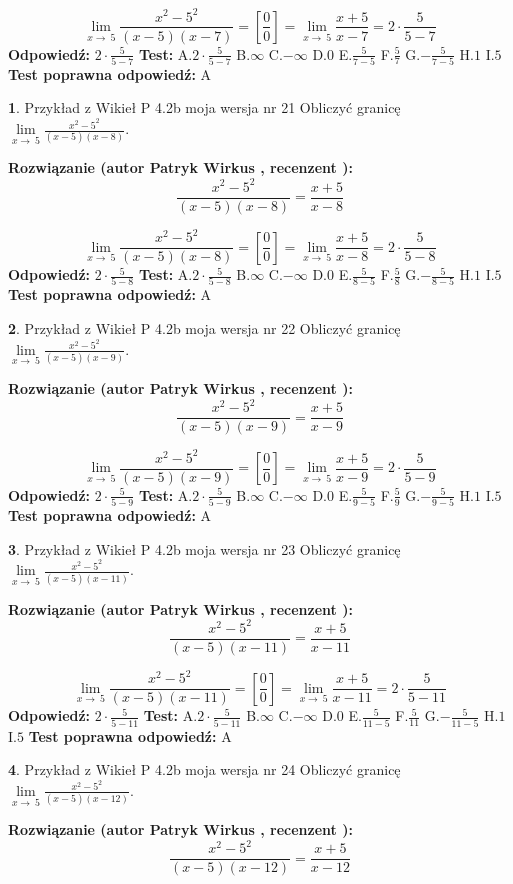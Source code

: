 \documentclass[12pt, a4paper]{article}
\theoremstyle{definition} %
\newtheorem{zad}{}
\newcommand{\zadStart}[1]{\begin{zad}#1\newline}
\newcommand{\zadStop}{\end{zad}}
\newcommand{\rozwStart}[2]{\noindent \textbf{Rozwiązanie (autor #1 , recenzent #2): }\newline}
\newcommand{\rozwStop}{\newline}
\newcommand{\odpStart}{\noindent \textbf{Odpowiedź:}\newline}
\newcommand{\odpStop}{\newline}
\newcommand{\testStart}{\noindent \textbf{Test:}\newline}
\newcommand{\testStop}{\newline}
\newcommand{\kluczStart}{\noindent \textbf{Test poprawna odpowiedź:}\newline}
\newcommand{\kluczStop}{\newline}
\begin{document}
$$\lim\limits_{x\to\ 5}\frac{x^{2}-5^{2}}{(x-5)(x-7)}=[\frac{0}{0}]=\lim\limits_{x\to\ 5}\frac{x+5}{x-7}=2 \cdot \frac{5}{5-7}$$
\rozwStop
\odpStart
$2 \cdot \frac{5}{5-7}$
\odpStop
\testStart
A.$2 \cdot \frac{5}{5-7}$
B.$\infty$
C.$-\infty$
D.$0$
E.$\frac{5}{7-5}$
F.$\frac{5}{7}$
G.$-\frac{5}{7-5}$
H.$1$
I.$5$
\testStop
\kluczStart
A
\kluczStop



\zadStart{Przykład z Wikieł P 4.2b moja wersja nr 21}
Obliczyć granicę $\lim\limits_{x\to\ 5}\frac{x^{2}-5^{2}}{(x-5)(x-8)}$.
\zadStop
\rozwStart{Patryk Wirkus}{}
$$\frac{x^{2}-5^{2}}{(x-5)(x-8)}=\frac{x+5}{x-8}$$

$$\lim\limits_{x\to\ 5}\frac{x^{2}-5^{2}}{(x-5)(x-8)}=[\frac{0}{0}]=\lim\limits_{x\to\ 5}\frac{x+5}{x-8}=2 \cdot \frac{5}{5-8}$$
\rozwStop
\odpStart
$2 \cdot \frac{5}{5-8}$
\odpStop
\testStart
A.$2 \cdot \frac{5}{5-8}$
B.$\infty$
C.$-\infty$
D.$0$
E.$\frac{5}{8-5}$
F.$\frac{5}{8}$
G.$-\frac{5}{8-5}$
H.$1$
I.$5$
\testStop
\kluczStart
A
\kluczStop



\zadStart{Przykład z Wikieł P 4.2b moja wersja nr 22}
Obliczyć granicę $\lim\limits_{x\to\ 5}\frac{x^{2}-5^{2}}{(x-5)(x-9)}$.
\zadStop
\rozwStart{Patryk Wirkus}{}
$$\frac{x^{2}-5^{2}}{(x-5)(x-9)}=\frac{x+5}{x-9}$$

$$\lim\limits_{x\to\ 5}\frac{x^{2}-5^{2}}{(x-5)(x-9)}=[\frac{0}{0}]=\lim\limits_{x\to\ 5}\frac{x+5}{x-9}=2 \cdot \frac{5}{5-9}$$
\rozwStop
\odpStart
$2 \cdot \frac{5}{5-9}$
\odpStop
\testStart
A.$2 \cdot \frac{5}{5-9}$
B.$\infty$
C.$-\infty$
D.$0$
E.$\frac{5}{9-5}$
F.$\frac{5}{9}$
G.$-\frac{5}{9-5}$
H.$1$
I.$5$
\testStop
\kluczStart
A
\kluczStop



\zadStart{Przykład z Wikieł P 4.2b moja wersja nr 23}
Obliczyć granicę $\lim\limits_{x\to\ 5}\frac{x^{2}-5^{2}}{(x-5)(x-11)}$.
\zadStop
\rozwStart{Patryk Wirkus}{}
$$\frac{x^{2}-5^{2}}{(x-5)(x-11)}=\frac{x+5}{x-11}$$

$$\lim\limits_{x\to\ 5}\frac{x^{2}-5^{2}}{(x-5)(x-11)}=[\frac{0}{0}]=\lim\limits_{x\to\ 5}\frac{x+5}{x-11}=2 \cdot \frac{5}{5-11}$$
\rozwStop
\odpStart
$2 \cdot \frac{5}{5-11}$
\odpStop
\testStart
A.$2 \cdot \frac{5}{5-11}$
B.$\infty$
C.$-\infty$
D.$0$
E.$\frac{5}{11-5}$
F.$\frac{5}{11}$
G.$-\frac{5}{11-5}$
H.$1$
I.$5$
\testStop
\kluczStart
A
\kluczStop



\zadStart{Przykład z Wikieł P 4.2b moja wersja nr 24}
Obliczyć granicę $\lim\limits_{x\to\ 5}\frac{x^{2}-5^{2}}{(x-5)(x-12)}$.
\zadStop
\rozwStart{Patryk Wirkus}{}
$$\frac{x^{2}-5^{2}}{(x-5)(x-12)}=\frac{x+5}{x-12}$$
\end{document}
